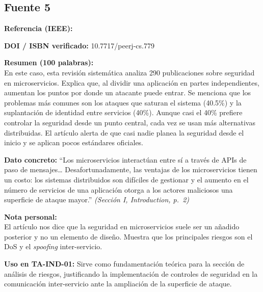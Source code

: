 \documentclass[11pt,a4paper]{article}
\newcommand{\ficha}[7]{%
  \begin{tcolorbox}[colback=white,colframe=black!60,
    title={Ficha bibliográfica},breakable]
    \textbf{Referencia (IEEE):}\\
    \fullcite{#1}

    \medskip
    \textbf{DOI / ISBN verificado:} #2

    \medskip
    \textbf{Resumen (100 palabras):}\\
    #3

    \medskip
    \textbf{Dato concreto:} #4 \textit{(#5)}

    \medskip
    \textbf{Nota personal:}\\
    #6

    \medskip
    \textbf{Uso en TA-IND-01:} #7
  \end{tcolorbox}
  \vspace{1em}
}
\begin{document}
\subsection{Fuente 5}
\ficha{fuente5}{10.7717/peerj-cs.779}{En este caso, esta revisión sistemática analiza 290 publicaciones sobre seguridad en microservicios. Explica que, al dividir una aplicación en partes independientes, aumentan los puntos por donde un atacante puede entrar. Se menciona que los problemas más comunes son los ataques que saturan el sistema (40.5\%) y la suplantación de identidad entre servicios (40\%). Aunque casi el 40\% prefiere controlar la seguridad desde un punto central, cada vez se usan más alternativas distribuidas. El artículo alerta de que casi nadie planea la seguridad desde el inicio y se aplican pocos estándares oficiales.}{\enquote{Los microservicios interactúan entre sí a través de APIs de paso de mensajes\ldots{} Desafortunadamente, las ventajas de los microservicios tienen un costo: los sistemas distribuidos son difíciles de gestionar y el aumento en el número de servicios de una aplicación otorga a los actores maliciosos una superficie de ataque mayor.}}{Sección I, \textit{Introduction}, p.~2}{El artículo nos dice que la seguridad en microservicios suele ser un añadido posterior y no un elemento de diseño. Muestra que los principales riesgos son el DoS y el \textit{spoofing} inter-servicio.}{Sirve como fundamentación teórica para la sección de análisis de riesgos, justificando la implementación de controles de seguridad en la comunicación inter-servicio ante la ampliación de la superficie de ataque.}
\nocite{fuente1,fuente2,fuente3,fuente4,fuente5}

\printbibliography[title={Referencias}]
\end{document}
